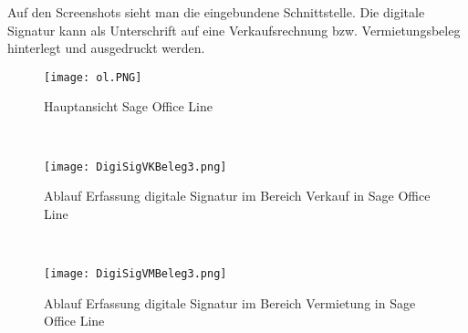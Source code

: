 Auf den Screenshots sieht man die eingebundene Schnittstelle. Die digitale Signatur kann als Unterschrift auf eine Verkaufsrechnung bzw. Vermietungsbeleg hinterlegt und ausgedruckt werden. 
\begin{figure}[!ht]
    \centering
    \texttt{[image: ol.PNG]}
    \caption[Hauptansicht Sage Office Line]{Hauptansicht Sage Office Line}
\end{figure}\\
\begin{figure}[!ht]
    \centering
    \texttt{[image: DigiSigVKBeleg3.png]}
    \caption[Ablauf Erfassung digitale Signatur in Sage Office Line (Verkauf)]{Ablauf Erfassung digitale Signatur im Bereich Verkauf in Sage Office Line}
\end{figure}\\
\begin{figure}[!ht]
    \centering
    \texttt{[image: DigiSigVMBeleg3.png]}
    \caption[Ablauf Erfassung digitale Signatur in Sage Office Line (Vermietung)]{Ablauf Erfassung digitale Signatur im Bereich Vermietung in Sage Office Line}
\end{figure}